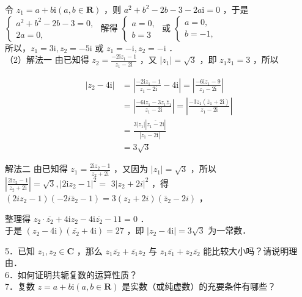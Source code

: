 \documentclass[10pt]{article}
\begin{document}
令 \(z_{1}=a+b \mathrm{i}(a, b \in \mathbf{R})\) ，则 \(a^{2}+b^{2}-2 b-3-2 a \mathrm{i}=0\) ，于是\\
\(\left\{\begin{array}{l}a^{2}+b^{2}-2 b-3=0, \\ 2 a=0,\end{array}\right.\) 解得 \(\left\{\begin{array}{l}a=0, \\ b=3\end{array}\right.\) 或 \(\left\{\begin{array}{l}a=0, \\ b=-1,\end{array}\right.\)\\
所以，\(z_{1}=3 \mathrm{i}, z_{2}=-5 \mathrm{i}\) 或 \(z_{1}=-\mathrm{i}, z_{2}=-\mathrm{i}\) ．\\
（2）解法一 由已知得 \(z_{2}=\frac{-2 \mathrm{i} z_{1}-1}{z_{1}-2 \mathrm{i}}\) ，又 \(\left|z_{1}\right|=\sqrt{3}\) ，即 \(z_{1} \bar{z}_{1}=3\) ，所以

\[
\begin{aligned}
\left|z_{2}-4 \mathrm{i}\right| & =\left|\frac{-2 \mathrm{i} z_{1}-1}{z_{1}-2 \mathrm{i}}-4 \mathrm{i}\right|=\left|\frac{-6 \mathrm{i} z_{1}-9}{z_{1}-2 \mathrm{i}}\right| \\
& =\left|\frac{-6 \mathrm{i} z_{1}-3 z_{1} \bar{z}_{1}}{z_{1}-2 \mathrm{i}}\right|=\left|\frac{-3 z_{1}\left(\bar{z}_{1}+2 \mathrm{i}\right)}{z_{1}-2 \mathrm{i}}\right| \\
& =\frac{3\left|z_{1}\right|\left|\overline{z_{1}-2 \mathrm{i}}\right|}{\left|z_{1}-2 \mathrm{i}\right|} \\
& =3 \sqrt{3}
\end{aligned}
\]

解法二 由已知得 \(z_{1}=\frac{2 \mathrm{i} z_{2}-1}{z_{2}+2 \mathrm{i}}\) ，又因为 \(\left|z_{1}\right|=\sqrt{3}\) ，所以 \(\left|\frac{2 \mathrm{i} z_{2}-1}{z_{2}+2 \mathrm{i}}\right|=\sqrt{3},\left|2 \mathrm{i} z_{2}-1\right|^{2}=\) \(3\left|z_{2}+2 i\right|^{2}\) ，得 \(\left(2 i z_{2}-1\right)\left(-2 i \bar{z}_{2}-1\right)=3\left(z_{2}+2 i\right)\left(\bar{z}_{2}-2 i\right)\) ，

整理得 \(z_{2} \cdot \overline{z_{2}}+4 \mathrm{i} z_{2}-4 \mathrm{i} \overline{z_{2}}-11=0\) ．\\
于是 \(\left(z_{2}-4 \mathrm{i}\right)\left(\overline{z_{2}}+4 \mathrm{i}\right)=27\) ，即 \(\left|z_{2}-4 \mathrm{i}\right|=3 \sqrt{3}\) 为一常数．

5．已知 \(z_{1}, z_{2} \in \mathbf{C}\) ，那么 \(z_{1} \overline{z_{2}}+\overline{z_{1}} z_{2}\) 与 \(z_{1} \overline{z_{1}}+z_{2} \overline{z_{2}}\) 能比较大小吗？请说明理由．\\
6．如何证明共轭复数的运算性质？\\
7．复数 \(z=a+b \mathrm{i}(a, b \in \mathbf{R})\) 是实数（或纯虚数）的充要条件有哪些？
\end{document}
